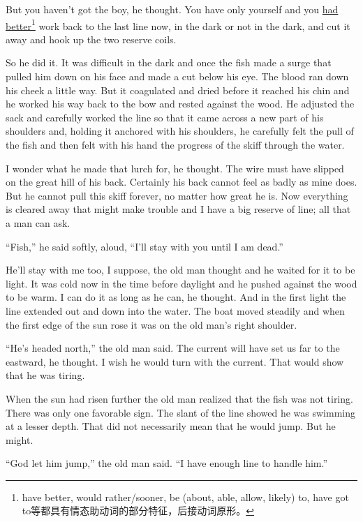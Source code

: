 \documentclass[fontset=ubuntu,zihao=-4]{ctexrep}
\begin{document}
But you haven't got the boy, he thought. You have only yourself and you
\uline{had better}\footnote{have better, would rather/sooner, be (about, able,
  allow, likely) to, have got to等都具有情态助动词的部分特征，后接动词原形。}
work back to the last line now, in the dark or not in the dark, and cut it
away and hook up the two reserve coils.

So he did it. It was difficult in the dark and once the fish made a
\gls{surge} that pulled him down on his face and made a cut below his eye.
The blood ran down his cheek a little way. But it \gls{coagulated} and dried
before it reached his \gls{chin} and he worked his way back to the bow and
rested against the wood. He \gls{adjusted} the sack and carefully worked the
line so that it came across a new part of his shoulders and, holding it
\gls{anchored} with his shoulders, he carefully felt the pull of the fish and
then felt with his hand the \gls{progress} of the skiff through the water.

I wonder what he made that \gls{lurch} for, he thought. The wire must have
slipped on the great hill of his back. Certainly his back cannot feel as
badly as mine does. But he cannot pull this skiff forever, no matter how
great he is. Now everything is cleared away that might make trouble and I
have a big reserve of line; all that a man can ask.

``Fish,'' he said softly, aloud, ``I'll stay with you until I am dead.''

He'll stay with me too, I \gls{suppose}, the old man thought and he waited for it
to be light. It was cold now in the time before daylight and he pushed
against the wood to be warm. I can do it as long as he can, he thought. And
in the first light the line \gls{extended} out and down into the water. The boat
moved steadily and when the first edge of the sun rose it was on the old
man's right shoulder.

``He's headed north,'' the old man said. The current will have set us far to
the eastward, he thought. I wish he would turn with the current. That would
show that he was tiring.

When the sun had risen further the old man \gls{realized} that the fish was
not tiring. There was only one \gls{favorable} sign. The slant of the line
showed he was swimming at a lesser depth. That did not \gls{necessarily}
mean that he would jump. But he might.

``God let him jump,'' the old man said. ``I have enough line to \gls{handle}
him.''
\end{document}
